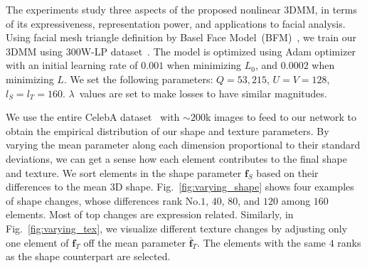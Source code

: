 \label{sec:exp}

The experiments study three aspects of the proposed nonlinear 3DMM, in terms of its expressiveness, representation power, and applications to facial analysis.
Using facial mesh triangle definition by Basel Face Model~(BFM)~\cite{paysan20093d}, we train our 3DMM using 300W-LP dataset~\cite{zhu2016face}. 
The model is optimized using Adam optimizer with an initial learning rate of $0.001$ when minimizing $L_0$, and $0.0002$ when minimizing $L$.
We set the following parameters: $Q=53,215$, $U=V=128$, $l_S=l_T=160$. $\lambda$~values are set to make losses to have similar magnitudes.


We use the entire CelebA dataset~\cite{liu2015faceattributes} with ${\sim}200$k images to feed to our network to obtain the empirical distribution of our shape and texture parameters. 
By varying the mean parameter along each dimension proportional to their standard deviations, we can get a sense how each element contributes to the final shape and texture.
We sort elements in the shape parameter $\mathbf{f}_S$ based on their differences to the mean 3D shape. 
Fig.~\ref{fig:varying_shape} shows four examples of shape changes, whose differences rank No.$1$, $40$, $80$, and $120$ among $160$ elements.
Most of top changes are expression related.
Similarly, in Fig.~\ref{fig:varying_tex}, we visualize different texture changes by adjusting only one element of $\mathbf{f}_T$ off the mean parameter $\bar{\mathbf{f}}_T$.
The elements with the same $4$ ranks as the shape counterpart are selected.


